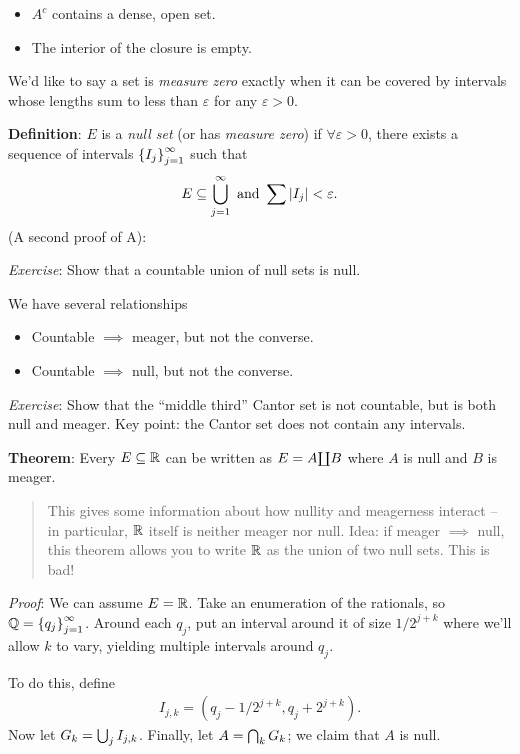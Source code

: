 \begin{itemize}
\tightlist
\item
  \(A^c\) contains a dense, open set.
\item
  The interior of the closure is empty.
\end{itemize}

We'd like to say a set is \emph{measure zero} exactly when it can be
covered by intervals whose lengths sum to less than \(\varepsilon\) for
any \(\varepsilon > 0\).

\textbf{Definition}: \(E\) is a \emph{null set} (or has \emph{measure
zero}) if \(\forall \varepsilon >0\), there exists a sequence of
intervals \(\left\{{I_j}\right\}_{j=1}^\infty\) such that
\begin{align*}
E \subseteq \bigcup_{j=1}^\infty \text{ and } \sum {\left\lvert {I_j} \right\rvert} < \varepsilon.
\end{align*}(A second proof of A):

\emph{Exercise}: Show that a countable union of null sets is null.

We have several relationships

\begin{itemize}
\tightlist
\item
  Countable \(\implies\) meager, but not the converse.
\item
  Countable \(\implies\) null, but not the converse.
\end{itemize}

\emph{Exercise}: Show that the ``middle third'' Cantor set is not
countable, but is both null and meager. Key point: the Cantor set does
not contain any intervals.

\textbf{Theorem}: Every \(E \subseteq {\mathbb{R}}\) can be written as
\(E = A {\coprod} B\) where \(A\) is null and \(B\) is meager.

\begin{quote}
This gives some information about how nullity and meagerness interact --
in particular, \({\mathbb{R}}\) itself is neither meager nor null. Idea: if
meager \(\implies\) null, this theorem allows you to write \({\mathbb{R}}\) as
the union of two null sets. This is bad!
\end{quote}

\emph{Proof}: We can assume \(E = {\mathbb{R}}\). Take an enumeration of the
rationals, so \({\mathbb{Q}} = \left\{{q_j}\right\}_{j=1}^\infty\). Around each \(q_j\),
put an interval around it of size \(1/2^{j+k}\) where we'll allow \(k\)
to vary, yielding multiple intervals around \(q_j\).

To do this, define
\begin{align*}
I_{j, k} = (q_j - 1/2^{j+k}, q_j + 2^{j+k})
.\end{align*} Now let \(G_k = \bigcup_j I_{j, k}\). Finally, let
\(A = \bigcap_k G_k\); we claim that \(A\) is null.

